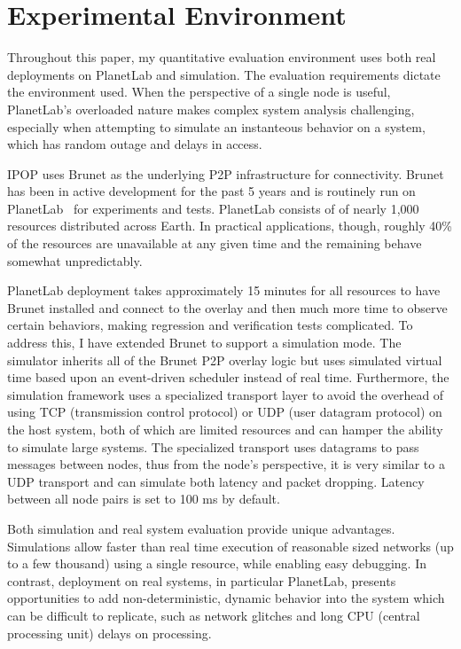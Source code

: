 \section{Experimental Environment}
\label{vpn:experimental}

Throughout this paper, my quantitative evaluation environment uses both real
deployments on PlanetLab and simulation.  The evaluation requirements dictate
the environment used.  When the perspective of a single node is useful,
PlanetLab's overloaded nature makes complex system analysis challenging,
especially when attempting to simulate an instanteous behavior on a system,
which has random outage and delays in access.

IPOP uses Brunet as the underlying P2P infrastructure for connectivity.  Brunet
has been in active development for the past 5 years and is routinely run on
PlanetLab~\cite{planetlab} for experiments and tests.  PlanetLab consists of of
nearly 1,000 resources distributed across Earth.  In practical applications,
though, roughly 40\% of the resources are unavailable at any given time and the
remaining behave somewhat unpredictably.

PlanetLab deployment takes approximately 15 minutes for all resources to have
Brunet installed and connect to the overlay and then much more time to observe
certain behaviors, making regression and verification tests complicated.  To
address this, I have extended Brunet to support a simulation mode. The
simulator inherits all of the Brunet P2P overlay logic but uses simulated
virtual time based upon an event-driven scheduler instead of real time.
Furthermore, the simulation framework uses a specialized transport layer to
avoid the overhead of using TCP (transmission control protocol) or UDP (user
datagram protocol) on the host system, both of which are limited resources and
can hamper the ability to simulate large systems.   The specialized transport
uses datagrams to pass messages between nodes, thus from the node's
perspective, it is very similar to a UDP transport and can simulate both
latency and packet dropping.  Latency between all node pairs is set to 100 ms
by default.

Both simulation and real system evaluation provide unique advantages.
Simulations allow faster than real time execution of reasonable sized networks
(up to a few thousand) using a single resource, while enabling easy debugging.
In contrast, deployment on real systems, in particular PlanetLab, presents
opportunities to add non-deterministic, dynamic behavior into the system which
can be difficult to replicate, such as network glitches and long CPU (central
processing unit) delays on processing.

